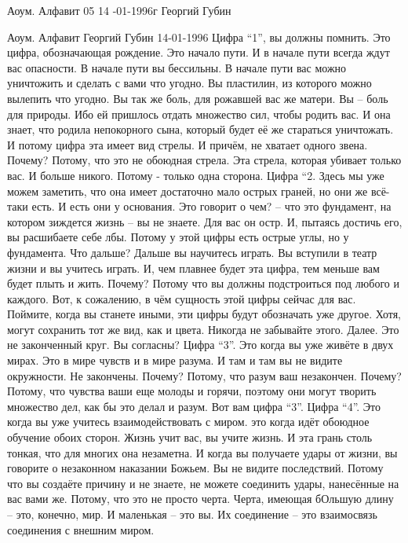 Аоум. Алфавит 05 14 -01-1996г
Георгий Губин
\people{**    }
  
Аоум. Алфавит
Георгий Губин
 14-01-1996     
  Цифра ``1'', вы должны помнить. Это цифра, обозначающая рождение. Это начало пути. И в начале пути всегда ждут вас опасности. В начале пути вы бессильны.  В начале пути вас можно уничтожить и сделать с вами что угодно. Вы пластилин, из которого можно вылепить что угодно. Вы так же боль, для рожавшей вас же  матери. Вы – боль для природы. Ибо ей пришлось отдать множество сил, чтобы родить вас. И она знает, что родила непокорного сына, который будет её же стараться уничтожать. И потому цифра эта имеет вид стрелы. И причём, не хватает одного звена. Почему? Потому, что это не обоюдная стрела. Эта стрела, которая убивает только вас. И больше никого. Потому - только одна сторона. 
  Цифра ``2. Здесь мы уже можем заметить, что она имеет достаточно мало острых граней, но они же всё-таки есть. И есть они у основания. Это говорит о чем? – что это фундамент, на котором зиждется жизнь – вы не знаете. Для вас он остр. И, пытаясь достичь его, вы расшибаете себе лбы. Потому у этой цифры есть острые углы, но у фундамента. Что дальше? Дальше вы научитесь играть. Вы вступили в театр жизни и вы учитесь играть. И, чем плавнее будет эта цифра, тем меньше вам будет плыть и жить. Почему? Потому что вы должны подстроиться под любого и каждого. Вот, к сожалению, в чём сущность этой цифры сейчас для вас. Поймите, когда вы станете иными, эти цифры будут обозначать уже другое. Хотя, могут сохранить тот же вид, как и цвета. Никогда не забывайте этого. Далее. Это не законченный круг. Вы согласны?
  Цифра ``3''. Это когда вы уже живёте в двух мирах. Это в мире чувств и в мире разума. И там и там вы не видите окружности. Не закончены. Почему? Потому, что разум ваш незакончен. Почему? Потому, что чувства ваши еще молоды и горячи, поэтому они могут творить множество дел, как бы это делал и разум. Вот вам цифра ``3''.
  Цифра ``4''. Это когда вы уже учитесь взаимодействовать с миром. это когда идёт обоюдное обучение обоих сторон. Жизнь учит вас, вы учите жизнь. И эта грань  столь тонкая, что для многих она незаметна. И когда вы получаете удары от жизни, вы говорите о незаконном наказании Божьем. Вы не видите последствий. Потому что вы создаёте причину и не знаете, не можете соединить удары, нанесённые на вас вами же. Потому, что это не просто черта. Черта, имеющая бОльшую длину – это, конечно, мир. И маленькая – это вы. Их соединение  – это взаимосвязь соединения с внешним миром. 
